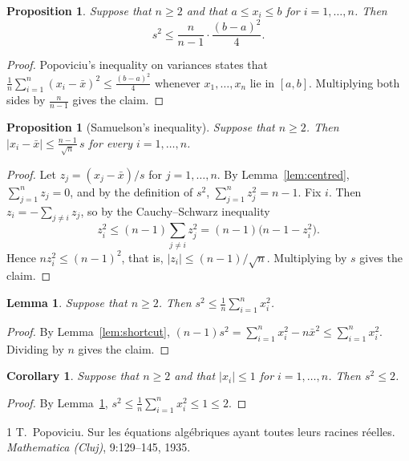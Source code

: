\documentclass[11pt]{article}
\newtheorem{lemma}[theorem]{Lemma}
\newtheorem{proposition}[theorem]{Proposition}
\newtheorem{corollary}[theorem]{Corollary}
\theoremstyle{definition}
\begin{document}
\begin{proposition}\label{prop:popoviciu}
Suppose that $n \ge 2$ and that $a \le x_i \le b$ for $i = 1, \dots, n$. Then
\[
  s^2 \le \frac{n}{n-1} \cdot \frac{(b-a)^2}{4} .
\]
\end{proposition}

\begin{proof}
Popoviciu's inequality on variances \cite{popoviciu} states that
$\frac{1}{n} \sum_{i=1}^n (x_i - \bar x)^2 \le \frac{(b-a)^2}{4}$ whenever $x_1, \dots, x_n$ lie in $[a, b]$.
Multiplying both sides by $\frac{n}{n-1}$ gives the claim.
\end{proof}

\begin{proposition}[Samuelson's inequality]\label{prop:samuelson}
Suppose that $n \ge 2$. Then $|x_i - \bar x| \le \frac{n-1}{\sqrt{n}} \, s$ for every $i = 1, \dots, n$.
\end{proposition}

\begin{proof}
Let $z_j = (x_j - \bar x)/s$ for $j = 1, \dots, n$. By Lemma~\ref{lem:centred}, $\sum_{j=1}^n z_j = 0$, and by
the definition of $s^2$, $\sum_{j=1}^n z_j^2 = n - 1$. Fix $i$. Then $z_i = -\sum_{j \ne i} z_j$, so by the
Cauchy--Schwarz inequality
\[
  z_i^2 \le (n-1) \sum_{j \ne i} z_j^2 = (n-1)\bigl(n - 1 - z_i^2\bigr) .
\]
Hence $n z_i^2 \le (n-1)^2$, that is, $|z_i| \le (n-1)/\sqrt{n}$. Multiplying by $s$ gives the claim.
\end{proof}

\begin{lemma}\label{lem:raw}
Suppose that $n \ge 2$. Then $s^2 \le \frac{1}{n} \sum_{i=1}^n x_i^2$.
\end{lemma}

\begin{proof}
By Lemma~\ref{lem:shortcut}, $(n-1) s^2 = \sum_{i=1}^n x_i^2 - n \bar x^2 \le \sum_{i=1}^n x_i^2$.
Dividing by $n$ gives the claim.
\end{proof}

\begin{corollary}\label{cor:unit}
Suppose that $n \ge 2$ and that $|x_i| \le 1$ for $i = 1, \dots, n$. Then $s^2 \le 2$.
\end{corollary}

\begin{proof}
By Lemma~\ref{lem:raw}, $s^2 \le \frac{1}{n} \sum_{i=1}^n x_i^2 \le 1 \le 2$.
\end{proof}

\begin{thebibliography}{1}
T.~Popoviciu.
\newblock Sur les \'equations alg\'ebriques ayant toutes leurs racines r\'eelles.
\newblock \emph{Mathematica (Cluj)}, 9:129--145, 1935.
\end{thebibliography}
\end{document}
